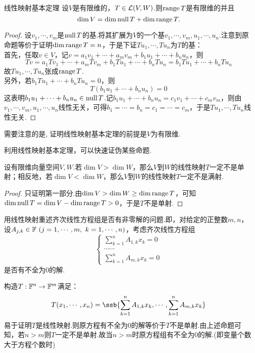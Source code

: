 \begin{proposition}{线性映射基本定理}
	设$V$是有限维的，$T \in \mathcal{L} (V,W)$.则$\operatorname{range} T$是有限维的并且$$\dim V = \dim \operatorname{null} T + \dim \operatorname{range} T.$$
\end{proposition}
\begin{proof}
	设$v_1, \cdots ,v_m$是$\operatorname{null} T$的基.将其扩展为$V$的一个基$v_1, \cdots ,v_m ,u_1, \cdots ,u_n$.注意到原命题等价于证明$\dim \operatorname{range} T = n$，于是下证$Tu_1, \cdots ,Tu_n$为$T$的基： \\
	首先，任取$v \in V$，记$v=a_1v_1 + \cdots + a_mv_m + b_1u_1 + \cdots + b_nu_n$，则$$Tv = a_1Tv_1 + \cdots + a_mTv_m + b_1Tu_1 + \cdots + b_nTu_n = b_1Tu_1 + \cdots + b_nTu_n$$
	故$Tu_1, \cdots ,Tu_n$张成$\operatorname{range} T$. \\
	另外，若$b_1Tu_1 + \cdots + b_nTu_n=0$，则$$T(b_1u_1 + \cdots + b_nu_n)=0$$
	这表明$b_1u_1 + \cdots + b_nu_n \in \operatorname{null} T$.记$b_1u_1 + \cdots + b_nu_n = c_1v_1 + \cdots + c_mv_m$，则由$v_1, \cdots ,v_m,u_1, \cdots ,u_n$线性无关，可得$b_1= \cdots = b_n = c_1 = \cdots = c_m$，于是$Tu_1, \cdots ,Tu_n$线性无关.
\end{proof}
\begin{remark}
	需要注意的是, 证明线性映射基本定理的前提是$V$为有限维.
\end{remark}

利用线性映射基本定理，可以快速证伪某些命题.

\begin{proposition}{}
	设有限维向量空间$V,W$.若$\dim V > \dim W$，那么$V$到$W$的线性映射$T$一定不是单射；相反地，若$\dim V < \dim W$，那么$V$到$W$的线性映射$T$一定不是满射.
\end{proposition}
\begin{proof}
	只证明第一部分.由$\dim V > \dim W \geq \dim \operatorname{range} T$，可知$\dim \operatorname{null} T = \dim V - \dim \operatorname{range} T > 0$，于是$T$不是单射.
\end{proof}

\begin{example}
	用线性映射重述齐次线性方程组是否有非零解的问题.即，对给定的正整数$m,n$，设$A_{j,k} \in \mathbb{F} ~(j=1,\cdots ,m,~k=1,\cdots ,n)$，考虑齐次线性方程组$$\begin{cases}
		\sum_{k=1}^{n} A_{1,k}x_k = 0 \\
		\cdots \cdots \\
		\sum_{k=1}^{n} A_{m,k}x_k = 0
	\end{cases}$$是否有不全为$0$的解.
\end{example}
\begin{solution}
	构造$T:\mathbb{F} ^n \to \mathbb{F} ^m$满足：$$T(x_1, \cdots ,x_n) = \ssb{\sum_{k=1}^{n} A_{1,k}x_k, \cdots , \sum_{k=1}^{n} A_{m,k}x_k}$$
	易于证明$T$是线性映射.则原方程有不全为$0$的解等价于$T$不是单射.由上述命题可知，若$n>m$则$T$一定不是单射.故当$n > m$时原方程组有不全为$0$的解.(即变量个数大于方程个数时)
\end{solution}

